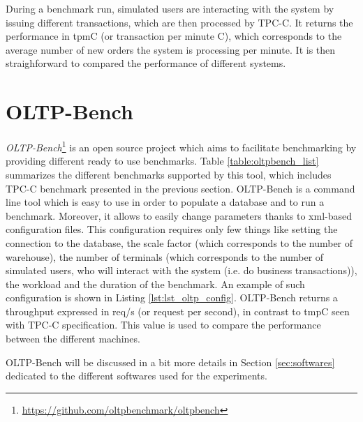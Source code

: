 During a benchmark run, simulated users are interacting with the system by issuing different transactions, which are then processed by TPC-C.
It returns the performance in tpmC (or transaction per minute C), which corresponds to the average number of new orders the system is processing per minute.
It is then straighforward to compared the performance of different systems.



\section{OLTP-Bench}
\textit{OLTP-Bench}\footnote{\url{https://github.com/oltpbenchmark/oltpbench}} is an open source project which aims to facilitate benchmarking by providing different ready to use benchmarks. 
Table \ref{table:oltpbench_list} summarizes the different benchmarks supported by this tool, which includes TPC-C benchmark presented in the previous section.
OLTP-Bench is a command line tool which is easy to use in order to populate a database and to run a benchmark.
Moreover, it allows to easily change parameters thanks to xml-based configuration files.
This configuration requires only few things like setting the connection to the database, the scale factor (which corresponds to the number of warehouse), the number of terminals (which corresponds to the number of simulated users, who will interact with the system (i.e. do business transactions)), the workload and the duration of the benchmark.
An example of such configuration is shown in Listing \ref{lst:lst_oltp_config}.
OLTP-Bench returns a throughput expressed in req/s (or request per second), in contrast to tmpC seen with TPC-C specification.
This value is used to compare the performance between the different machines.

OLTP-Bench will be discussed in a bit more details in Section \ref{sec:softwares} dedicated to the different softwares used for the experiments.

